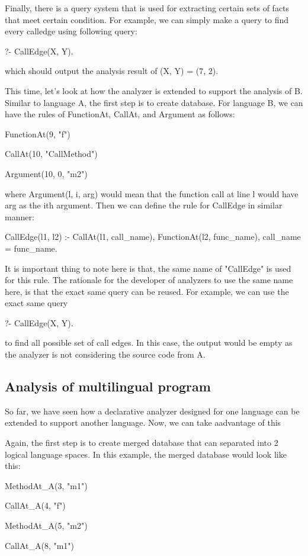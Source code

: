 Finally, there is a query system that is used for extracting certain sets of
facts that meet certain condition. For example, we can simply make a query to
find every calledge using following query:

?- CallEdge(X, Y).

which should output the analysis result of (X, Y) = (7, 2).

This time, let's look at how the analyzer is extended to support the analysis
of B. Similar to language A, the first step is to create database. For language
B, we can have the rules of FunctionAt, CallAt, and Argument as follows:

FunctionAt(9, "f")

CallAt(10, "CallMethod")

Argument(10, 0, "m2")

where Argument(l, i, arg) would mean that the function call at line l would
have arg as the ith argument.  Then we can define the rule for CallEdge in
similar manner:

CallEdge(l1, l2) :-
    CallAt(l1, call\_name),
    FunctionAt(l2, func\_name),
    call\_name = func\_name.

It is important thing to note here is that, the same name of "CallEdge" is used
for this rule. The rationale for the developer of analyzers to use the same
name here, is that the exact same query can be reused. For example, we can use
the exact same query

?- CallEdge(X, Y).

to find all possible set of call edges. In this case, the output would be empty
as the analyzer is not considering the source code from A.

\subsection{Analysis of multilingual program}
So far, we have seen how a declarative analyzer designed for one language can
be extended to support another language. Now, we can take aadvantage of this

Again, the first step is to create merged database that can separated into 2
logical language spaces. In this example, the merged database would look like
this:

MethodAt\_A(3, "m1")

CallAt\_A(4, "f")

MethodAt\_A(5, "m2")

CallAt\_A(8, "m1")

